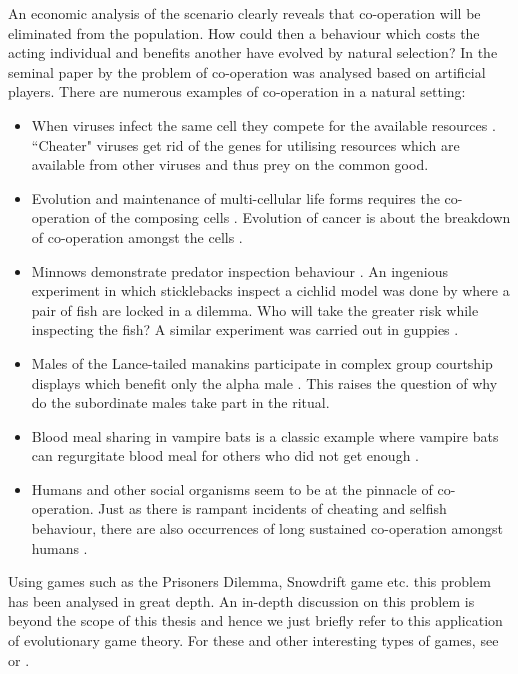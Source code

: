 \documentclass[oneside,11pt,a4paper]{book}
\begin{document}
An economic analysis of the scenario clearly reveals that co-operation will be eliminated from the population.
How could then a behaviour which costs the acting individual and benefits another have evolved by natural selection?
In the seminal paper by \citet{axelrod:1981yo} the problem of co-operation was analysed based on artificial players.
There are numerous examples of co-operation in a natural setting:
\begin{itemize}
\item When viruses infect the same cell they compete for the available resources \citep{turner:1999hp,turner:2005aa}.
``Cheater" viruses get rid of the genes for utilising resources which are available from other viruses and thus prey on the common good.
\item Evolution and maintenance of multi-cellular life forms requires the co-operation of the composing cells \citep{nowak:2006bo}.
Evolution of cancer is about the breakdown of co-operation amongst the cells \citep{dingli:2006cc}.
\item Minnows demonstrate predator inspection behaviour \citep{george:1961aa}.
An ingenious experiment in which sticklebacks inspect a cichlid model was done by \citet{milinski:1987ju,milinski:1988aa,milinski:1990aa} where a pair of fish are locked in a dilemma.
Who will take the greater risk while inspecting the fish?
A similar experiment was carried out in guppies \citep{dugatkin:1988aa,dugatkin:1990aa,dugatkin:1997aa}.
\item Males of the Lance-tailed manakins participate in complex group courtship displays which benefit only the alpha male \citep{duval:2007aa}.
This raises the question of why do the subordinate males take part in the ritual.
\item Blood meal sharing in vampire bats is a classic example where vampire bats can regurgitate blood meal for others who did not get enough \citep{wilkinson:1984sg}.
\item Humans and other social organisms seem to be at the pinnacle of co-operation.
Just as there is rampant incidents of cheating and selfish behaviour, there are also occurrences of long sustained co-operation amongst humans \citep{smith:1776le,wedekind:1996zx,milinski:1998zp,milinski:2001og,fehr:2002bv,fehr:2004pi,sommerfeld:2007fk,henrich:2006lr,sigmund:2007oz,kummerli:2007vl,fehr:2008oz,gachter:2009la,traulsen:2010pn}.
\end{itemize}
%
Using games such as the Prisoners Dilemma, Snowdrift game etc. this problem has been analysed in great depth.
An in-depth discussion on this problem is beyond the scope of this thesis and hence we just briefly refer to this application of evolutionary game theory.
For these and other interesting types of games, see \citet{gintis:2000bo} or \citet{sigmund:2010bo}.
\end{document}
